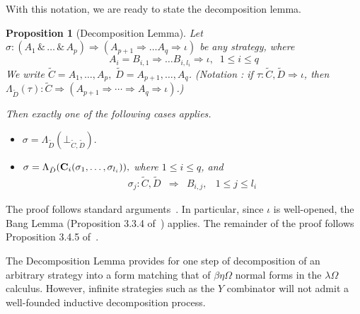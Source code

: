 \documentclass[a4paper,11pt]{article}
\newtheorem{proposition}{Proposition}[section]
\newcommand{\llwith}{\, \& \,}
\newcommand{\lambdaomega}{\lambda\Omega}
\begin{document}
With this notation, we are ready to state the decomposition lemma.
\begin{proposition}[Decomposition Lemma]\label{decomp}
Let $\sigma:(A_1\llwith\dots\llwith
A_p)\Rightarrow(A_{p+1}\Rightarrow\dots A_q\Rightarrow \iota)$ be
any strategy, where $$A_i=B_{i,1}\Rightarrow\dots
B_{i,l_i}\Rightarrow \iota,\;\; 1\leq i\leq q$$ We write
$\tilde{C}=A_1,\dots,A_p,\; \tilde{D}=A_{p+1},\dots,A_q$.
(Notation : if $\tau:\tilde{C},\tilde{D}\Rightarrow \iota$, then
$\Lambda_{\tilde{D}}(\tau):\tilde{C}\Rightarrow(A_{p+1}\Rightarrow\cdots
\Rightarrow A_q\Rightarrow \iota)$.)

Then exactly one of the following cases applies.
\begin{itemize}
\item[(i)] $\sigma=\Lambda_{\tilde{D}}(\bot_{\tilde{C},\tilde{D}}).$
\item[(ii)]
  $\sigma=\Lambda_{\tilde{D}}({\bf
C}_i(\sigma_1,\dots,\sigma_{l_i})),$ where $1\leq i\leq q$, and
\[\begin{array}{lllc}
\sigma_j:\tilde{C},\tilde{D} & \Rightarrow & B_{i,j}, & 1\leq
j\leq l_i
\end{array}\]
\end{itemize}
\end{proposition}
The proof follows standard arguments~\cite{AJM00,AL00}. In
particular, since $\iota$ is well-opened, the Bang Lemma
(Proposition 3.3.4 of~\cite{AJM00}) applies. The remainder of the
proof follows Proposition 3.4.5 of~\cite{AJM00}.

The Decomposition Lemma provides for one step of decomposition of
an arbitrary strategy into a form matching that of $\beta\eta\Omega$
normal forms in the $\lambdaomega$ calculus. However, infinite
strategies such as the $Y$ combinator  will not admit a well-founded
inductive decomposition process.
\end{document}

